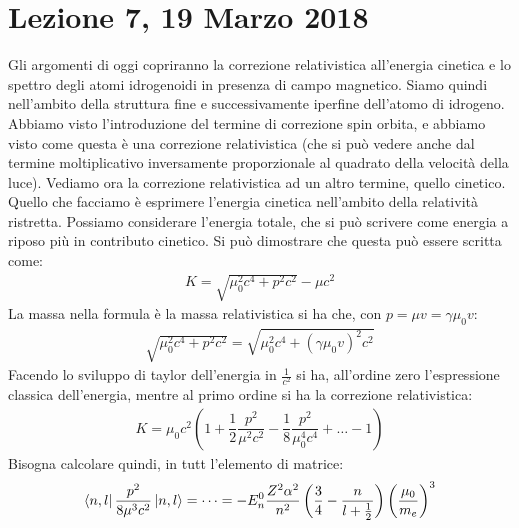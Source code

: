 \documentclass[../AppuntiStruttura]{subfiles}
\begin{document}
	\section{Lezione 7, 19 Marzo 2018}
	Gli argomenti di oggi copriranno la correzione relativistica all'energia cinetica e lo spettro degli atomi idrogenoidi in presenza di campo magnetico. Siamo quindi nell'ambito della struttura fine e successivamente iperfine dell'atomo di idrogeno. Abbiamo visto l'introduzione del termine di correzione spin orbita, e abbiamo visto come questa è una correzione relativistica (che si può vedere anche dal termine moltiplicativo inversamente proporzionale al quadrato della velocità della luce). Vediamo ora la correzione relativistica ad un altro termine, quello cinetico. Quello che facciamo è esprimere l'energia cinetica nell'ambito della relatività ristretta. Possiamo considerare l'energia totale, che si può scrivere come energia a riposo più in contributo cinetico. Si può dimostrare che questa può essere scritta come:
	\begin{gather}
		K=\sqrt{\mu_{0}^{2}c^{4}+p^{2}c^{2}}-\mu c^{2}
	\end{gather}
	La massa nella formula è la massa relativistica si ha che, con $ p=\mu v=\gamma\mu_{0}v $:
	\begin{gather}
		\sqrt{\mu_{0}^{2}c^{4}+p^{2}c^{2}}=\sqrt{\mu_{0}^{2}c^{4}+\left(\gamma\mu_{0}v\right)^{2}c^{2}}
	\end{gather}
	Facendo lo sviluppo di taylor dell'energia in $ \frac{1}{c^{2}} $ si ha, all'ordine zero l'espressione classica dell'energia, mentre al primo ordine si ha la correzione relativistica:
	\begin{gather}
		K=\mu_{0}c^{2}\left(1+\dfrac{1}{2}\dfrac{p^{2}}{\mu^{2}c^{2}}-\dfrac{1}{8}\dfrac{p^{2}}{\mu_{0}^{4}c^{4}}+\dots-1\right)
	\end{gather}
	Bisogna calcolare quindi, in tutt l'elemento di matrice:
	\begin{gather}
	\bra{n,l}\dfrac{p^{2}}{8\mu^{3}c^{2}}\ket{n,l}=\dots=-E_{n}^{0}\dfrac{Z^{2}\alpha^{2}}{n^{2}}\left(\dfrac{3}{4}-\dfrac{n}{l+\frac{1}{2}}\right)\left(\dfrac{\mu_{0}}{m_{e}}\right)^{3}
	\end{gather}
\end{document}
